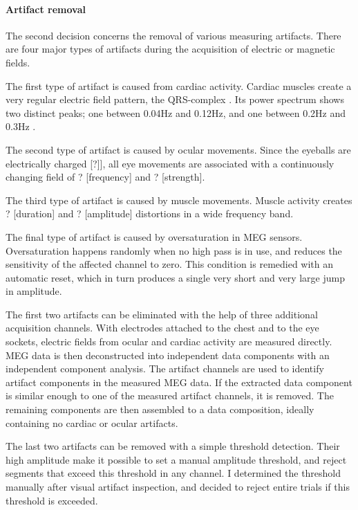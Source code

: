\paragraph{Artifact removal}
The second decision concerns the removal of various measuring artifacts.
There are four major types of artifacts during the acquisition of electric or magnetic fields.

The first type of artifact is caused from cardiac activity.
Cardiac muscles create a very regular electric field pattern, the QRS-complex \cite{1.5.ecg.a}.
Its power spectrum shows two distinct peaks; one between 0.04Hz and 0.12Hz, and one between 0.2Hz and 0.3Hz \cite{1.5.ecg.b}.

The second type of artifact is caused by ocular movements.
Since the eyeballs are electrically charged [?]], all eye movements are associated with a continuously changing field of ? [frequency] and ? [strength].

The third type of artifact is caused by muscle movements.
Muscle activity creates ? [duration] and ? [amplitude] distortions in a wide frequency band.

The final type of artifact is caused by oversaturation in MEG sensors.
Oversaturation happens randomly when no high pass is in use, and reduces the sensitivity of the affected channel to zero.
This condition is remedied with an automatic reset, which in turn produces a single very short and very large jump in amplitude.

The first two artifacts can be eliminated with the help of three additional acquisition channels.
With electrodes attached to the chest and to the eye sockets, electric fields from ocular and cardiac activity are measured directly.
MEG data is then deconstructed into independent data components with an independent component analysis.
The artifact channels are used to identify artifact components in the measured MEG data.
If the extracted data component is similar enough to one of the measured artifact channels, it is removed. 
The remaining components are then assembled to a data composition, ideally containing no cardiac or ocular artifacts.

The last two artifacts can be removed with a simple threshold detection.
Their high amplitude make it possible to set a manual amplitude threshold, and reject segments that exceed this threshold in any channel.
I determined the threshold manually after visual artifact inspection, and decided to reject entire trials if this threshold is exceeded.

